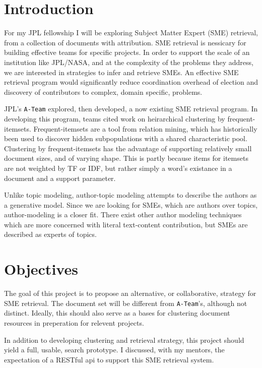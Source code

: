 \documentclass{article}
\begin{document}
\begin{multicols}{2}

\section{Introduction}

For my JPL fellowship I will be exploring Subject Matter Expert (SME) retrieval,
from a collection of documents with attribution. SME retrieval is nessicary for
building effective teams for specific projects. In order to support the scale of an
institution like JPL/NASA, and at the complexity of the problems they address, we are
interested in strategies to infer and retrieve SMEs. An effective SME retrieval program
would significantly reduce coordination overhead of election and discovery of
contributors to complex, domain specific, problems.

JPL's \texttt{A-Team} explored, then developed, a now existing SME retrieval program.
In developing this program, teams cited work on heirarchical clustering by
frequent-itemsets\cite{wang2003,kiran2010}. Frequent-itemsets\cite{Agrawal1993} are a
tool from relation mining, which has historically been used to discover hidden
subpopulations with a shared characteristic pool. Clustering by frequent-itemsets has the
advantage of supporting relatively small document sizes, and of varying shape. This is
partly because items for itemsets are not weighted by TF or IDF, but rather simply
a word's existance in a document and a support parameter.

Unlike topic modeling, author-topic modeling attempts to describe the authors as
a generative model. Since we are looking for SMEs, which are authors over topics,
author-modeling is a closer fit. There exist other author modeling techniques\cite{Rexha2018}
which are more concerned with literal text-content contribution, but SMEs are
described as experts of topics.

\section{Objectives}

The goal of this project is to propose an alternative, or collaborative, strategy for
SME retrieval. The document set will be different from \texttt{A-Team}'s, although
not distinct. Ideally, this should also serve as a bases for clustering document
resources in preperation for relevent projects.

In addition to developing clustering and retrieval strategy, this project should yield
a full, usable, search prototype. I discussed, with my mentors, the expectation of a
RESTful api to support this SME retrieval system.


\end{multicols}
\end{document}
